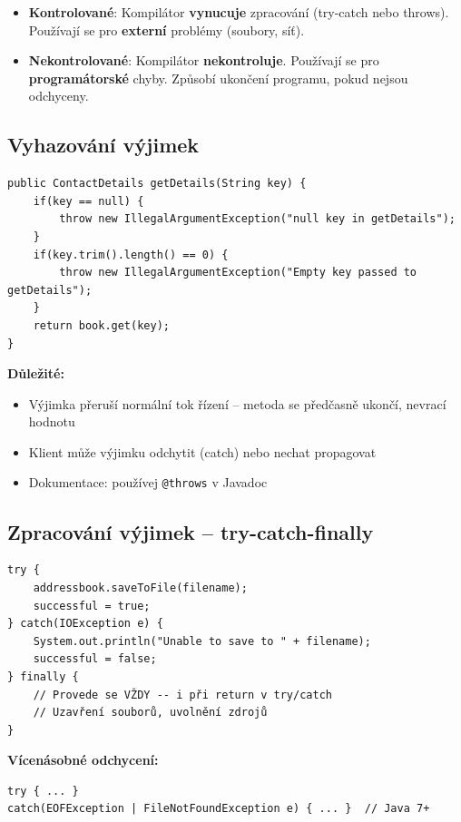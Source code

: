 \documentclass[11pt,a4paper]{article}
\begin{document}
\begin{tcolorbox}[warnbox,title=Klíčové rozdíly]
\begin{itemize}[leftmargin=*]
    \item \textbf{Kontrolované}: Kompilátor \textbf{vynucuje} zpracování (try-catch nebo throws). Používají se pro \textbf{externí} problémy (soubory, síť).
    \item \textbf{Nekontrolované}: Kompilátor \textbf{nekontroluje}. Používají se pro \textbf{programátorské} chyby. Způsobí ukončení programu, pokud nejsou odchyceny.
\end{itemize}
\end{tcolorbox}

\subsection{Vyhazování výjimek}

\begin{verbatim}
public ContactDetails getDetails(String key) {
    if(key == null) {
        throw new IllegalArgumentException("null key in getDetails");
    }
    if(key.trim().length() == 0) {
        throw new IllegalArgumentException("Empty key passed to getDetails");
    }
    return book.get(key);
}
\end{verbatim}

\textbf{Důležité:}
\begin{itemize}
    \item Výjimka přeruší normální tok řízení -- metoda se předčasně ukončí, nevrací hodnotu
    \item Klient může výjimku odchytit (catch) nebo nechat propagovat
    \item Dokumentace: používej \texttt{@throws} v Javadoc
\end{itemize}

\subsection{Zpracování výjimek -- try-catch-finally}

\begin{verbatim}
try {
    addressbook.saveToFile(filename);
    successful = true;
} catch(IOException e) {
    System.out.println("Unable to save to " + filename);
    successful = false;
} finally {
    // Provede se VŽDY -- i při return v try/catch
    // Uzavření souborů, uvolnění zdrojů
}
\end{verbatim}

\textbf{Vícenásobné odchycení:}
\begin{verbatim}
try { ... }
catch(EOFException | FileNotFoundException e) { ... }  // Java 7+
\end{verbatim}
\end{document}
